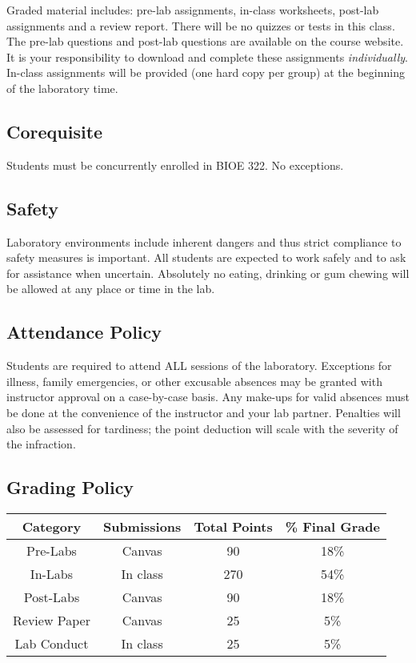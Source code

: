 \documentclass{article}
\begin{document}
Graded material includes: pre-lab assignments, in-class worksheets, post-lab assignments and a review report.  There will be no quizzes or tests in this class. The pre-lab questions and post-lab questions are available on the course website. It is your responsibility to download and complete these assignments \textit{individually}. In-class assignments will be provided (one hard copy per group) at the beginning of the laboratory time.


\subsection*{Corequisite}
Students must be concurrently enrolled in BIOE 322. No exceptions.

\subsection*{Safety}
Laboratory environments include inherent dangers and thus strict compliance to safety measures is important. All students are expected to work safely and to ask for assistance when uncertain. Absolutely no eating, drinking or gum chewing will be allowed at any place or time in the lab.

\subsection*{Attendance Policy}
Students are required to attend ALL sessions of the laboratory. Exceptions for illness, family emergencies, or other excusable absences may be granted with instructor approval on a case-by-case basis. Any make-ups for valid absences must be done at the convenience of the instructor and your lab partner. Penalties will also be assessed for tardiness; the point deduction will scale with the severity of the infraction.

\subsection*{Grading Policy}

\begin{table}[h!]
	\centering
\begin{tabular}[h!]{cccc}
\toprule
	Category & Submissions & Total Points & \% Final Grade\\
	\midrule
	Pre-Labs & Canvas & 90 & 18\%\\
	In-Labs & In class & 270 & 54\%\\
	Post-Labs & Canvas & 90 & 18\%\\
	Review Paper & Canvas & 25 & 5\%\\
	Lab Conduct & In class & 25 & 5\%\\
	\bottomrule
\end{tabular}
\end{table}
\end{document}
